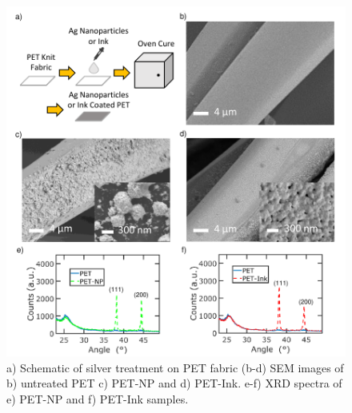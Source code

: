 \documentclass[journal=jacsat,manuscript=article]{achemso}
\begin{document}
\begin{figure}[H]
       \centering
    \includegraphics[width= \linewidth]{Figures/fig1_char.pdf}
   \caption[Sample characterization of silver coated fabric]{a) Schematic of silver treatment on PET fabric (b-d) SEM images of b) untreated PET c) PET-NP and d) PET-Ink. e-f) XRD spectra of e) PET-NP and f) PET-Ink samples.}

  
\label{fig:SEM}
\end{figure}
\end{document}
